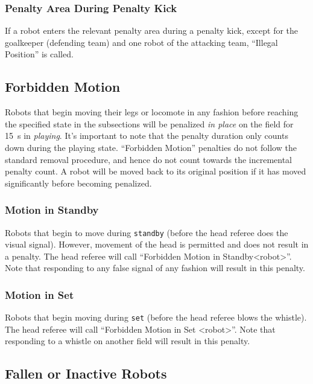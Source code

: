 \subsubsection{Penalty Area During Penalty Kick}
\label{sec:ip_penalty_kick}

If a robot enters the relevant penalty area during a penalty kick, except for the goalkeeper (defending team) and one robot of the attacking team, ``Illegal Position'' is called.

\subsection{Forbidden Motion}
Robots that begin moving their legs or locomote in any fashion before reaching the specified state in the subsections
will be penalized \textit{in place} on the field for \qty{15}{\second} in \textit{playing}. It's important to note that the penalty duration only counts down during the playing state.
``Forbidden Motion'' penalties do not follow the standard removal procedure, and hence do not count towards the incremental penalty count.
A robot will be moved back to its original position if it has moved significantly before becoming penalized.

\subsubsection{Motion in Standby}
\label{sec:motion_in_standby}

Robots that begin to move during \texttt{standby} (\ie before the head referee does the visual signal).
However, movement of the head is permitted and does not result in a penalty.
The head referee will call ``Forbidden Motion in Standby\textless robot\textgreater''.
Note that responding to any false signal of any fashion will result in this penalty.

\subsubsection{Motion in Set}
\label{sec:motion_in_set}

Robots that begin moving during \texttt{set} (\ie before the head referee blows the whistle).
The head referee will call ``Forbidden Motion in Set \textless robot\textgreater''.
Note that responding to a whistle on another field will result in this penalty.

\subsection{Fallen or Inactive Robots}
\label{sec:fallenrobots}


